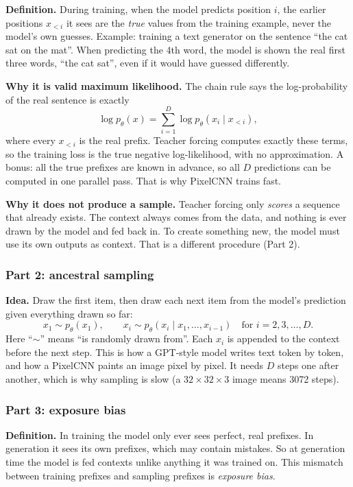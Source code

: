 \documentclass[12pt,a4paper]{article}
\begin{document}
\textbf{Definition.} During training, when the model predicts position $i$, the earlier positions $x_{<i}$ it sees are the \emph{true} values from the training example, never the model's own guesses. Example: training a text generator on the sentence ``the cat sat on the mat''. When predicting the 4th word, the model is shown the real first three words, ``the cat sat'', even if it would have guessed differently.

\textbf{Why it is valid maximum likelihood.} The chain rule says the log-probability of the real sentence is exactly
\[
\log p_\theta(x) = \sum_{i=1}^{D} \log p_\theta(x_i \mid x_{<i}),
\]
where every $x_{<i}$ is the real prefix. Teacher forcing computes exactly these terms, so the training loss is the true negative log-likelihood, with no approximation. A bonus: all the true prefixes are known in advance, so all $D$ predictions can be computed in one parallel pass. That is why PixelCNN trains fast.

\textbf{Why it does not produce a sample.} Teacher forcing only \emph{scores} a sequence that already exists. The context always comes from the data, and nothing is ever drawn by the model and fed back in. To create something new, the model must use its own outputs as context. That is a different procedure (Part 2).

\subsubsection{Part 2: ancestral sampling}

\textbf{Idea.} Draw the first item, then draw each next item from the model's prediction given everything drawn so far:
\[
x_1 \sim p_\theta(x_1), \qquad x_i \sim p_\theta(x_i \mid x_1, \ldots, x_{i-1}) \quad \text{for } i = 2, 3, \ldots, D.
\]
Here ``$\sim$'' means ``is randomly drawn from''. Each $x_i$ is appended to the context before the next step. This is how a GPT-style model writes text token by token, and how a PixelCNN paints an image pixel by pixel. It needs $D$ steps one after another, which is why sampling is slow (a $32\times32\times3$ image means 3072 steps).

\subsubsection{Part 3: exposure bias}

\textbf{Definition.} In training the model only ever sees perfect, real prefixes. In generation it sees its own prefixes, which may contain mistakes. So at generation time the model is fed contexts unlike anything it was trained on. This mismatch between training prefixes and sampling prefixes is \emph{exposure bias}.
\end{document}
